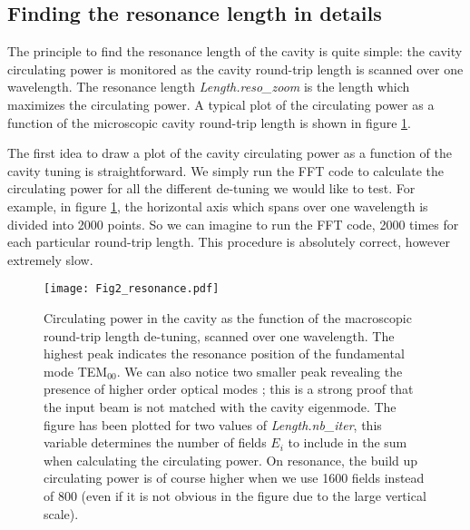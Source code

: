 \subsection{Finding the resonance length in details}
\label{sec2:3}
The principle to find the resonance length of the cavity is quite simple: the cavity circulating power is monitored as the cavity round-trip length is scanned over one wavelength. The resonance length \textsl{Length.reso\_zoom} is the length which maximizes the circulating power. A typical plot of the circulating power as a function of the microscopic cavity round-trip length is shown in figure \ref{fig2:cavres}.

The first idea to draw a plot of the cavity circulating power as a function of the cavity tuning is straightforward. We simply run the FFT code to calculate the circulating power for all the different de-tuning we would like to test. For example, in figure \ref{fig2:cavres}, the horizontal axis which spans over one wavelength is divided into 2000 points. So we can imagine to run the FFT code, 2000 times for each particular round-trip length. This procedure is absolutely correct, however extremely slow.


\begin{figure}
\begin{center}
\texttt{[image: Fig2\_resonance.pdf]}
\end{center}
\caption{\label{fig2:cavres} Circulating power in the cavity as the function of the macroscopic round-trip length de-tuning, scanned over one wavelength. The highest peak indicates the resonance position of the fundamental mode TEM$_{00}$. We can also notice two smaller peak revealing the presence of higher order optical modes ; this is a strong proof that the input beam is not matched with the cavity eigenmode. The figure has been plotted for two values of \emph{Length.nb\_iter}, this variable determines the number of fields $E_i$ to include in the sum when calculating the circulating power. On resonance, the build up circulating power is of course higher when we use 1600 fields instead of 800 (even if it is not obvious in the figure due to the large vertical scale).}
\end{figure}



